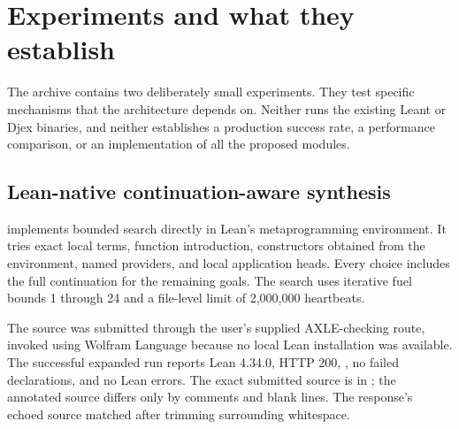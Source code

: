 \section{Experiments and what they establish}\label{sec:experiments}

The archive contains two deliberately small experiments. They test specific
mechanisms that the architecture depends on. Neither runs the existing Leant
or Djex binaries, and neither establishes a production success rate, a
performance comparison, or an implementation of all the proposed modules.

\subsection{Lean-native continuation-aware synthesis}

 implements bounded search directly in Lean's
metaprogramming environment. It tries exact local terms, function introduction,
constructors obtained from the environment, named providers, and local
application heads. Every choice includes the full continuation for the
remaining goals. The search uses iterative fuel bounds 1 through 24 and a
file-level limit of 2,000,000 heartbeats.

The source was submitted through the user's supplied AXLE-checking route,
invoked using Wolfram Language because no local Lean installation was available.
The successful expanded run reports Lean 4.34.0, HTTP 200, ,
no failed declarations, and no Lean errors. The exact submitted source is in
; the annotated source differs only by
comments and blank lines. The response's echoed source matched after trimming
surrounding whitespace.

